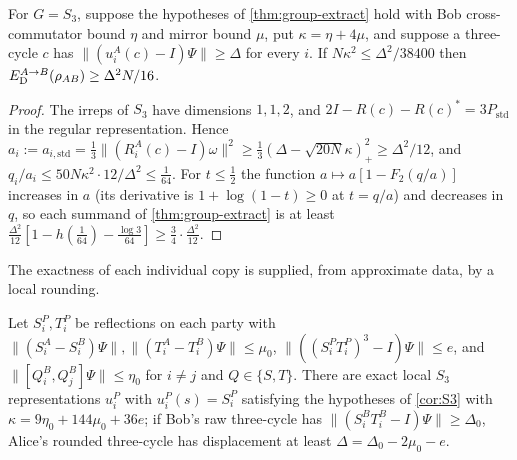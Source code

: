 \begin{corollary}\label{cor:S3}
For $G=S_3$, suppose the hypotheses of \cref{thm:group-extract} hold with Bob cross-commutator bound $\eta$ and mirror
bound $\mu$, put $\kappa=\eta+4\mu$, and suppose a three-cycle $c$ has $\|(u^A_i(c)-I)\Psi\|\ge\Delta$ for every $i$. If
$N\kappa^2\le\Delta^2/38400$ then $E_{\mathrm D}^{A\to B}(\rho_{AB})\ge\Delta^2N/16$.
\end{corollary}

\begin{proof}
The irreps of $S_3$ have dimensions $1,1,2$, and $2I-R(c)-R(c)^*=3P_{\mathrm{std}}$ in the regular representation. Hence
$a_i:=a_{i,\mathrm{std}}=\frac13\|(R^A_i(c)-I)\omega\|^2\ge\frac13(\Delta-\sqrt{20N}\kappa)_+^2\ge\Delta^2/12$, and
$q_i/a_i\le50N\kappa^2\cdot12/\Delta^2\le\frac1{64}$. For $t\le\frac12$ the function $a\mapsto a[1-F_2(q/a)]$ increases in
$a$ (its derivative is $1+\log(1-t)\ge0$ at $t=q/a$) and decreases in $q$, so each summand of \cref{thm:group-extract} is at
least $\frac{\Delta^2}{12}[1-h(\frac1{64})-\frac{\log3}{64}]\ge\frac34\cdot\frac{\Delta^2}{12}$.
\end{proof}

The exactness of each individual copy is supplied, from approximate data, by a local rounding.

\begin{lemma}\label{lem:S3-round}
Let $S_i^P,T_i^P$ be reflections on each party with $\|(S_i^A-S_i^B)\Psi\|,\|(T_i^A-T_i^B)\Psi\|\le\mu_0$,
$\|((S_i^PT_i^P)^3-I)\Psi\|\le e$, and $\|[Q_i^B,Q_j^B]\Psi\|\le\eta_0$ for $i\ne j$ and $Q\in\{S,T\}$. There are exact local
$S_3$ representations $u_i^P$ with $u_i^P(s)=S_i^P$ satisfying the hypotheses of \cref{cor:S3} with
$\kappa=9\eta_0+144\mu_0+36e$; if Bob's raw three-cycle has $\|(S_i^BT_i^B-I)\Psi\|\ge\Delta_0$, Alice's rounded three-cycle
has displacement at least $\Delta=\Delta_0-2\mu_0-e$.
\end{lemma}

